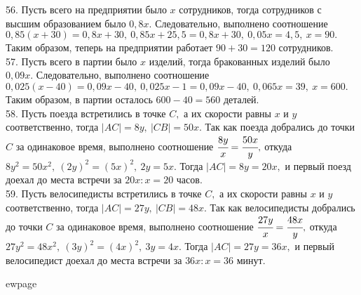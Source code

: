 56. Пусть всего на предприятии было $x$ сотрудников, тогда сотрудников с высшим образованием было $0,8x.$ Следовательно, выполнено соотношение $0,85(x+30)=0,8x+30,\ 0,85x+25,5=0,8x+30,\ 0,05x=4,5,\ x=90.$ Таким образом, теперь на предприятии работает $90+30=120$ сотрудников.\\
57. Пусть всего в партии было $x$ изделий, тогда бракованных изделий было $0,09x.$ Следовательно, выполнено соотношение $0,025(x-40)=0,09x-40,\ 0,025x-1=0,09x-40,\ 0,065x=39,\ x=600.$ Таким образом, в партии осталось $600-40=560$ деталей.\\
58. Пусть поезда встретились в точке $C,$ а их скорости равны $x$ и $y$ соответственно, тогда $|AC|=8y,\ |CB|=50x.$ Так как поезда добрались до точки $C$ за одинаковое время, выполнено соотношение $\cfrac{8y}{x}=\cfrac{50x}{y},$ откуда $8y^2=50x^2,\ (2y)^2=(5x)^2,\ 2y=5x.$ Тогда $|AC|=8y=20x,$ и первый поезд доехал до места встречи за $20x:x=20$ часов.\\
59. Пусть велосипедисты встретились в точке $C,$ а их скорости равны $x$ и $y$ соответственно, тогда $|AC|=27y,\ |CB|=48x.$ Так как велосипедисты добрались до точки $C$ за одинаковое время, выполнено соотношение $\cfrac{27y}{x}=\cfrac{48x}{y},$ откуда $27y^2=48x^2,\ (3y)^2=(4x)^2,\ 3y=4x.$ Тогда $|AC|=27y=36x,$ и первый велосипедист доехал до места встречи за $36x:x=36$ минут.

ewpage
